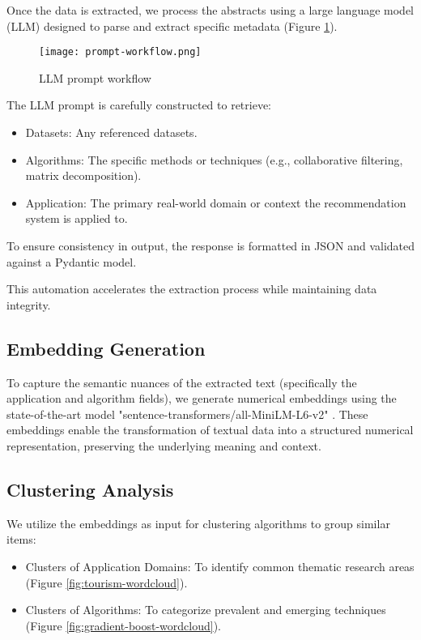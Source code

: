 \documentclass[
	a4paper, %
	10pt, %
	unnumberedsections, %
	twoside, %
]{LTJournalArticle}
\begin{document}
Once the data is extracted, we process the abstracts using a large language model (LLM) designed to parse and extract specific metadata (Figure \ref{fig:prompt-workflow}).

\begin{figure}[htbp]
    \centering
    \texttt{[image: prompt-workflow.png]}
    \caption{LLM prompt workflow}
    \label{fig:prompt-workflow}
\end{figure}

The LLM prompt is carefully constructed to retrieve:

\begin{itemize}
    \item Datasets: Any referenced datasets.  
    \item Algorithms: The specific methods or techniques (e.g., collaborative filtering, matrix decomposition).  
    \item Application: The primary real-world domain or context the recommendation system is applied to.
\end{itemize}

To ensure consistency in output, the response is formatted in JSON and validated against a Pydantic model.

This automation accelerates the extraction process while maintaining data integrity.

\subsection{Embedding Generation}

To capture the semantic nuances of the extracted text (specifically the application and algorithm fields), we generate numerical embeddings using the state-of-the-art model "sentence-transformers/all-MiniLM-L6-v2" \cite{reimers-2019-sentence-bert}.  
These embeddings enable the transformation of textual data into a structured numerical representation, preserving the underlying meaning and context.

\subsection{Clustering Analysis}

We utilize the embeddings as input for clustering algorithms to group similar items:

\begin{itemize}
    \item Clusters of Application Domains: To identify common thematic research areas (Figure \ref{fig:tourism-wordcloud}).  
    \item Clusters of Algorithms: To categorize prevalent and emerging techniques (Figure \ref{fig:gradient-boost-wordcloud}).
\end{itemize}
\end{document}
